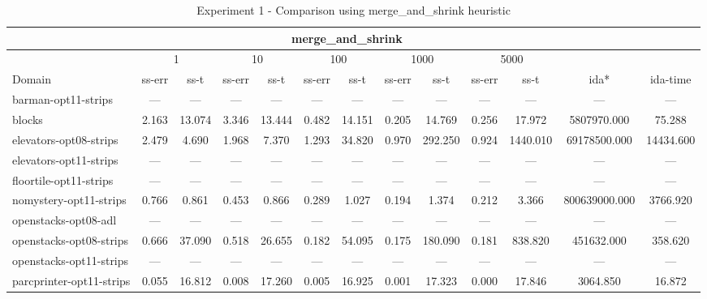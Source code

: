 \documentclass[a4paper,12pt]{article}
\begin{document}
\begin{table}[]
\footnotesize\setlength{\tabcolsep}{1.0pt}
\caption{Experiment 1 - Comparison using {merge\_and\_shrink} heuristic}
\label{table4}
\begin{tabular}{l@{\hspace{4pt}} *{12}{c}}
\hline
                                      & \multicolumn{10}{c}{{merge\_and\_shrink}}                                                                                                          & \multicolumn{2}{l}{}      \\ \hline

                  & \multicolumn{2}{|c|}{1} & \multicolumn{2}{c|}{10} & \multicolumn{2}{c|}{100} & \multicolumn{2}{c|}{1000} & \multicolumn{2}{c|}{5000}                   \\ \hline
Domain                  & ss-err  & ss-t  & ss-err  & ss-t  & ss-err  & ss-t  & ss-err  & ss-t  & ss-err  & ss-t  & ida*  & ida-time  \\ \hline
barman-opt11-strips     & --- & --- & --- & --- & --- & --- & --- & --- & --- & --- & --- & --- \\ \hline
blocks                  & 2.163 & 13.074 & 3.346 & 13.444 & 0.482 & 14.151 & 0.205 & 14.769 & 0.256 & 17.972 & 5807970.000 & 75.288 \\ \hline
elevators-opt08-strips  & 2.479 & 4.690 & 1.968 & 7.370 & 1.293 & 34.820 & 0.970 & 292.250 & 0.924 & 1440.010 & 69178500.000 & 14434.600 \\ \hline
elevators-opt11-strips  & --- & --- & --- & --- & --- & --- & --- & --- & --- & --- & --- & --- \\ \hline
floortile-opt11-strips  & --- & --- & --- & --- & --- & --- & --- & --- & --- & --- & --- & --- \\ \hline
nomystery-opt11-strips  & 0.766 & 0.861 & 0.453 & 0.866 & 0.289 & 1.027 & 0.194 & 1.374 & 0.212 & 3.366 & 800639000.000 & 3766.920 \\ \hline
openstacks-opt08-adl    & --- & --- & --- & --- & --- & --- & --- & --- & --- & --- & --- & --- \\ \hline
openstacks-opt08-strips & 0.666 & 37.090 & 0.518 & 26.655 & 0.182 & 54.095 & 0.175 & 180.090 & 0.181 & 838.820 & 451632.000 & 358.620 \\ \hline
openstacks-opt11-strips & --- & --- & --- & --- & --- & --- & --- & --- & --- & --- & --- & --- \\ \hline
parcprinter-opt11-strips& 0.055 & 16.812 & 0.008 & 17.260 & 0.005 & 16.925 & 0.001 & 17.323 & 0.000 & 17.846 & 3064.850 & 16.872 \\ \hline

\end{tabular}
\end{table}
\end{document}
